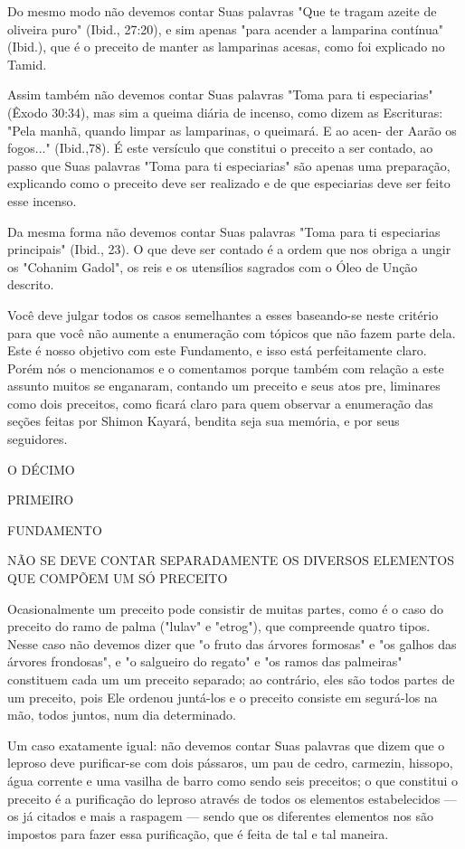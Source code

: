 \begin{itemize}
\begin{enumrate}
Do mesmo modo não devemos contar Suas palavras "Que te tragam azeite de
oliveira puro" (Ibid., 27:20), e sim apenas "para acender a lamparina
contínua" (Ibid.), que é o preceito de manter as lamparinas acesas, como
foi explicado no Tamid.

Assim também não devemos contar Suas palavras "Toma para ti
es­peciarias" (Êxodo 30:34), mas sim a queima diária de incenso, como
dizem as Escrituras: "Pela manhã, quando limpar as lamparinas, o
queimará. E ao acen-
der Aarão os fogos..." (Ibid.,78). É este versículo que constitui o
preceito a ser contado, ao passo que Suas palavras "Toma para ti
especiarias" são apenas uma preparação, explicando como o preceito deve
ser realizado e de que especia­rias deve ser feito esse incenso.

Da mesma forma não devemos contar Suas palavras "Toma para ti
especiarias principais" (Ibid., 23). O que deve ser contado é a ordem
que nos obriga a ungir os "Cohanim Gadol", os reis e os utensílios
sagrados com o Óleo de Unção descrito.

Você deve julgar todos os casos semelhantes a esses baseando-se neste
critério para que você não aumente a enumeração com tópicos que não
fazem parte dela. Este é nosso objetivo com este Fundamento, e isso está
perfeitamente claro. Porém nós o mencionamos e o comentamos porque
também com rela­ção a este assunto muitos se enganaram, contando um
preceito e seus atos pre­, liminares como dois preceitos, como ficará
claro para quem observar a enume­ração das seções feitas por Shimon
Kayará, bendita seja sua memória, e por seus seguidores.

O DÉCIMO

PRIMEIRO

FUNDAMENTO

NÃO SE DEVE CONTAR SEPARADAMENTE OS DIVERSOS ELEMENTOS QUE COMPÕEM UM SÓ
PRECEITO

Ocasionalmente um preceito pode consistir de muitas partes, como é o
caso do preceito do ramo de palma ("lulav" e "etrog"), que compreende
quatro tipos. Nesse caso não devemos dizer que "o fruto das árvores
formo­sas" e "os galhos das árvores frondosas", e "o salgueiro do
regato" e "os ra­mos das palmeiras" constituem cada um um preceito
separado; ao contrário, eles são todos partes de um preceito, pois Ele
ordenou juntá-los e o preceito consiste em segurá-los na mão, todos
juntos, num dia determinado.

Um caso exatamente igual: não devemos contar Suas palavras que dizem que
o leproso deve purificar-se com dois pássaros, um pau de cedro,
carmezin, hissopo, água corrente e uma vasilha de barro como sendo seis
pre­ceitos; o que constitui o preceito é a purificação do leproso
através de todos os elementos estabelecidos --- os já citados e mais a
raspagem --- sendo que os diferentes elementos nos são impostos para
fazer essa purificação, que é fei­ta de tal e tal maneira.


\end{enumrate}
\end{itemize}
